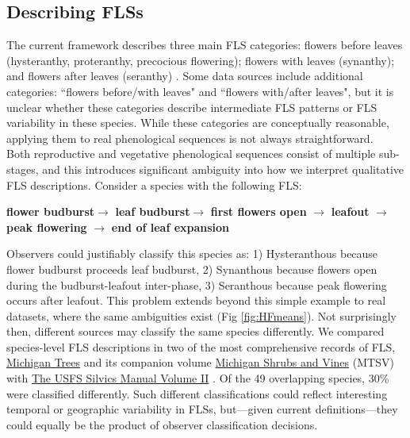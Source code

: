 \documentclass{article}
\begin{document}
\subsection*{Describing FLSs}
\noindent  The current framework describes three main FLS categories: flowers before leaves (hysteranthy, proteranthy, precocious flowering); flowers with leaves (synanthy); and flowers after leaves (seranthy) \citep{Lamont2011, Heinig1899}. Some data sources \citep[e.g.][]{Burns1990,Barnes2004} include additional categories: ``flowers before/with leaves" and ``flowers with/after leaves", but it is unclear whether these categories describe intermediate FLS patterns or FLS variability in these species. While these categories are conceptually reasonable, applying them to real phenological sequences is not always straightforward.\\

\noindent Both reproductive and vegetative phenological sequences consist of multiple sub-stages, and this introduces significant ambiguity into how we interpret qualitative FLS descriptions. Consider a species with the following FLS:\\

\begin{center}
\textbf{flower budburst}$\rightarrow$ \textbf{leaf budburst}$\rightarrow$ \textbf{first flowers open} $\rightarrow$ \textbf{leafout} $\rightarrow$ \textbf{peak flowering} $\rightarrow$ \textbf{end of leaf expansion} \\
\end{center}

\noindent Observers could justifiably classify this species as: 1) Hysteranthous because flower budburst proceeds leaf budburst, 2) Synanthous because flowers open during the budburst-leafout inter-phase, 3) Seranthous because peak flowering occurs after leafout. This problem extends beyond this simple example to real datasets, \citep[e.g.][]{OKeefe2015} where the same ambiguities exist (Fig \ref{fig:HFmeans}). Not surprisingly then, different sources may classify the same species differently. We compared species-level FLS descriptions in two of the most comprehensive records of FLS, \underline{Michigan Trees} and its companion volume \underline{Michigan Shrubs and Vines} (MTSV) \citep{Barnes2004,Barnes2016} with \underline{The USFS Silvics Manual Volume II} \citep{Burns1990}. Of the 49 overlapping species, 30\% were classified differently. Such different classifications could reflect interesting temporal or geographic variability in FLSs, but---given current definitions---they could equally be the product of observer classification decisions.\\
\end{document}
